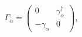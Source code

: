 \begin{equation}
 \Gamma_\alpha=\begin{pmatrix} 0 & \gamma_\alpha^\dagger\\
                               -\gamma_\alpha & 0\end{pmatrix},
\end{equation}

